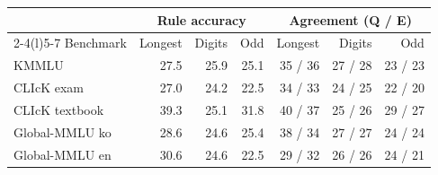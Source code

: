 \begin{tabular}{@{}lrrrrrr@{}}
\toprule
 & \multicolumn{3}{c}{Rule accuracy} & \multicolumn{3}{c}{Agreement (Q / E)} \\
\cmidrule(lr){2-4}\cmidrule(l){5-7}
Benchmark & Longest & Digits & Odd & Longest & Digits & Odd \\
\midrule
KMMLU & 27.5 & 25.9 & 25.1 & 35 / 36 & 27 / 28 & 23 / 23 \\
CLIcK exam & 27.0 & 24.2 & 22.5 & 34 / 33 & 24 / 25 & 22 / 20 \\
CLIcK textbook & 39.3 & 25.1 & 31.8 & 40 / 37 & 25 / 26 & 29 / 27 \\
Global-MMLU ko & 28.6 & 24.6 & 25.4 & 38 / 34 & 27 / 27 & 24 / 24 \\
Global-MMLU en & 30.6 & 24.6 & 22.5 & 29 / 32 & 26 / 26 & 24 / 21 \\
\bottomrule
\end{tabular}
